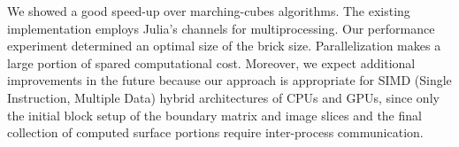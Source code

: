 We showed a good speed-up over marching-cubes algorithms. 
The existing implementation employs Julia's channels
for multiprocessing. 
Our performance experiment determined an optimal size of the brick size.
Parallelization makes a large portion of spared computational cost. 
%
Moreover, we expect additional improvements in the future because our approach is appropriate  for SIMD (Single Instruction, Multiple Data) hybrid architectures of CPUs and GPUs, since only the initial block setup of the boundary matrix and image slices and the final collection of computed surface portions require inter-process communication. 

